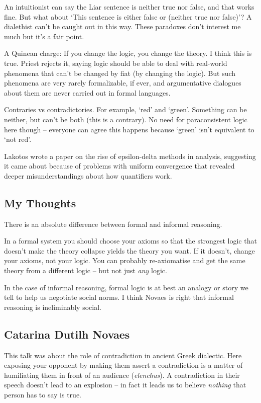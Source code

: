 \documentclass[oneside,english]{article}
\theoremstyle{plain}
\theoremstyle{definition}
\theoremstyle{definition}
\begin{document}
An intuitionist can say the Liar sentence is neither true nor false, and that works fine. But what about `This sentence is either false or (neither true nor false)'? A dialethist can't be caught out in this way. These paradoxes don't interest me much but it's a fair point.

A Quinean charge: If you change the logic, you change the theory. I think this is true. Priest rejects it, saying logic should be able to deal with real-world phenomena that can't be changed by fiat (by changing the logic). But such phenomena are very rarely formalizable, if ever, and argumentative dialogues about them are never carried out in formal languages.

Contraries vs contradictories. For example, `red' and `green'. Something can be neither, but can't be both (this is a contrary). No need for paraconsistent logic here though -- everyone can agree this happens because `green' isn't equivalent to `not red'.

Lakotos wrote a paper on the rise of epsilon-delta methods in analysis, suggesting it came about because of problems with uniform convergence that revealed deeper misunderstandings about how quantifiers work.

\subsection{My Thoughts}
	
There is an absolute difference between formal and informal reasoning. 

In a formal system you should choose your axioms so that the strongest logic that doesn't make the theory collapse yields the theory you want. If it doesn't, change your axioms, not your logic. You can probably re-axiomatise and get the same theory from a different logic -- but not just \emph{any} logic.

In the case of informal reasoning, formal logic is at best an analogy or story we tell to help us negotiate social norms. I think Novaes is right that informal reasoning is ineliminably social. 

\subsection{Catarina Dutilh Novaes}

This talk was about the role of contradiction in ancient Greek dialectic. Here exposing your opponent by making them assert a contradiction is a matter of humiliating them in front of an audience (\emph{elenchus}). A contradiction in their speech doesn't lead to an explosion -- in fact it leads us to believe \emph{nothing} that person has to say is true.
\end{document}
